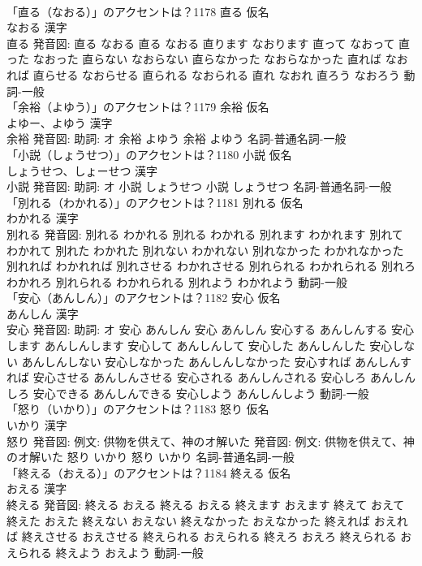 \documentclass[8pt]{extreport}
\begin{document}
\begin{CJK}{UTF8}{min}
\\	「直る（なおる）」のアクセントは？1178	直る 仮名　
\\	なおる 漢字　
\\	直る 発音図:	直る なおる		直る なおる 直ります なおります 直って なおって 直った なおった 直らない なおらない 直らなかった なおらなかった 直れば なおれば 直らせる なおらせる 直られる なおられる 直れ なおれ 直ろう なおろう				動詞-一般 
\\	「余裕（よゆう）」のアクセントは？1179	余裕 仮名　
\\	よゆー、よゆう 漢字　
\\	余裕 発音図: 助詞: オ	余裕 よゆう		余裕 よゆう				名詞-普通名詞-一般 
\\	「小説（しょうせつ）」のアクセントは？1180	小説 仮名　
\\	しょうせつ、しょーせつ 漢字　
\\	小説 発音図: 助詞: オ	小説 しょうせつ		小説 しょうせつ				名詞-普通名詞-一般 
\\	「別れる（わかれる）」のアクセントは？1181	別れる 仮名　
\\	わかれる 漢字　
\\	別れる 発音図:	別れる わかれる		別れる わかれる 別れます わかれます 別れて わかれて 別れた わかれた 別れない わかれない 別れなかった わかれなかった 別れれば わかれれば 別れさせる わかれさせる 別れられる わかれられる 別れろ わかれろ 別れられる わかれられる 別れよう わかれよう				動詞-一般 
\\	「安心（あんしん）」のアクセントは？1182	安心 仮名　
\\	あんしん 漢字　
\\	安心 発音図: 助詞: オ	安心 あんしん		安心 あんしん 安心する あんしんする 安心します あんしんします 安心して あんしんして 安心した あんしんした 安心しない あんしんしない 安心しなかった あんしんしなかった 安心すれば あんしんすれば 安心させる あんしんさせる 安心される あんしんされる 安心しろ あんしんしろ 安心できる あんしんできる 安心しよう あんしんしよう				動詞-一般 
\\	「怒り（いかり）」のアクセントは？1183	怒り 仮名　
\\	いかり 漢字　
\\	怒り 発音図: 例文: 供物を供えて、神のオ解いた 発音図: 例文: 供物を供えて、神のオ解いた	怒り いかり		怒り いかり				名詞-普通名詞-一般 
\\	「終える（おえる）」のアクセントは？1184	終える 仮名　
\\	おえる 漢字　
\\	終える 発音図:	終える おえる		終える おえる 終えます おえます 終えて おえて 終えた おえた 終えない おえない 終えなかった おえなかった 終えれば おえれば 終えさせる おえさせる 終えられる おえられる 終えろ おえろ 終えられる おえられる 終えよう おえよう				動詞-一般 

\end{CJK}
\end{document}
